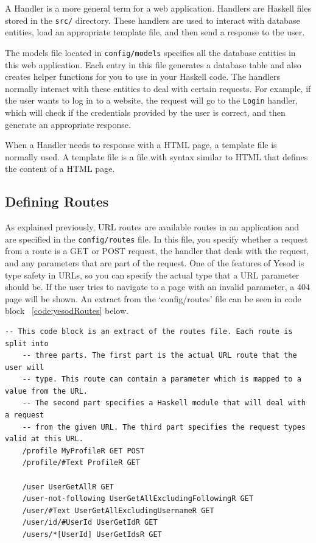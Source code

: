 A Handler is a more general term for a web application. Handlers are Haskell
files stored in the \texttt{src/} directory. These handlers are used to interact
with database entities, load an appropriate template file, and then send
a response to the user. \parencite[Understanding a Request]{yesodBook}

The models file located in \texttt{config/models} specifies all the database
entities in this web application. Each entry in this file generates a database
table and also creates helper functions for you to use in your Haskell code.
The handlers normally interact with these entities to deal with certain requests.
For example, if the user wants to log in to a website, the request will go to the
\texttt{Login} handler, which will check if the credentials provided by the user
is correct, and then generate an appropriate response.

When a Handler needs to response with a HTML page, a template file is
normally used. A template file is a file with syntax similar to HTML
that defines the content of a HTML page.

\subsection{Defining Routes}

As explained previously, URL routes are available routes in an application and are specified in the 
\texttt{config/routes} file. In this file, you specify whether a request from a route is a
GET or POST request, the handler that deals with the request, and any parameters
that are part of the request. One of the features of Yesod is type safety in URLs,
so you can specify the actual type that a URL parameter should be. If the user
tries to navigate to a page with an invalid parameter, a 404 page will be shown.
An extract from the `config/routes' file can be seen in code block 
~\ref{code:yesodRoutes} below.


\begin{lstlisting}[caption={Yesod URL routes},label={code:yesodRoutes}]
	-- This code block is an extract of the routes file. Each route is split into
	-- three parts. The first part is the actual URL route that the user will
	-- type. This route can contain a parameter which is mapped to a value from the URL.
	-- The second part specifies a Haskell module that will deal with a request
	-- from the given URL. The third part specifies the request types valid at this URL.
	/profile MyProfileR GET POST
	/profile/#Text ProfileR GET
	
	/user UserGetAllR GET
	/user-not-following UserGetAllExcludingFollowingR GET
	/user/#Text UserGetAllExcludingUsernameR GET
	/user/id/#UserId UserGetIdR GET
	/users/*[UserId] UserGetIdsR GET
\end{lstlisting}

